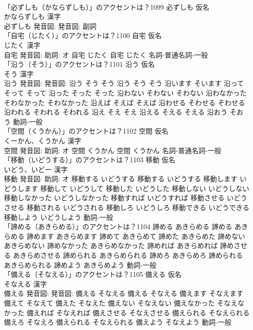 \documentclass[8pt]{extreport}
\begin{document}
\begin{CJK}{UTF8}{min}
\\	「必ずしも（かならずしも）」のアクセントは？1099	必ずしも 仮名　
\\	かならずしも 漢字　
\\	必ずしも 発音図: 発音図:							副詞 
\\	「自宅（じたく）」のアクセントは？1100	自宅 仮名　
\\	じたく 漢字　
\\	自宅 発音図: 助詞: オ	自宅 じたく		自宅 じたく				名詞-普通名詞-一般 
\\	「沿う（そう）」のアクセントは？1101	沿う 仮名　
\\	そう 漢字　
\\	沿う 発音図: 発音図:	沿う そう そう		沿う そう そう 沿います そいます 沿って そって そって 沿った そった そった 沿わない そわない そわない 沿わなかった そわなかった そわなかった 沿えば そえば そえば 沿わせる そわせる そわせる 沿われる そわれる そわれる 沿え そえ そえ 沿える そえる そえる 沿おう そおう				動詞-一般 
\\	「空間（くうかん）」のアクセントは？1102	空間 仮名　
\\	くーかん、くうかん 漢字　
\\	空間 発音図: 助詞: オ	空間 くうかん		空間 くうかん				名詞-普通名詞-一般 
\\	「移動（いどうする）」のアクセントは？1103	移動 仮名　
\\	いどう、いどー 漢字　
\\	移動 発音図: 助詞: オ	移動する いどうする		移動する いどうする 移動します いどうします 移動して いどうして 移動した いどうした 移動しない いどうしない 移動しなかった いどうしなかった 移動すれば いどうすれば 移動させる いどうさせる 移動される いどうされる 移動しろ いどうしろ 移動できる いどうできる 移動しよう いどうしよう				動詞-一般 
\\	「諦める（あきらめる）」のアクセントは？1104		諦める あきらめる		諦める あきらめる 諦めます あきらめます 諦めて あきらめて 諦めた あきらめた 諦めない あきらめない 諦めなかった あきらめなかった 諦めれば あきらめれば 諦めさせる あきらめさせる 諦められる あきらめられる 諦めろ あきらめろ 諦められる あきらめられる 諦めよう あきらめよう				動詞-一般 
\\	「備える（そなえる）」のアクセントは？1105	備える 仮名　
\\	そなえる 漢字　
\\	備える 発音図: 発音図:	備える そなえる		備える そなえる 備えます そなえます 備えて そなえて 備えた そなえた 備えない そなえない 備えなかった そなえなかった 備えれば そなえれば 備えさせる そなえさせる 備えられる そなえられる 備えろ そなえろ 備えられる そなえられる 備えよう そなえよう				動詞-一般 

\end{CJK}
\end{document}

